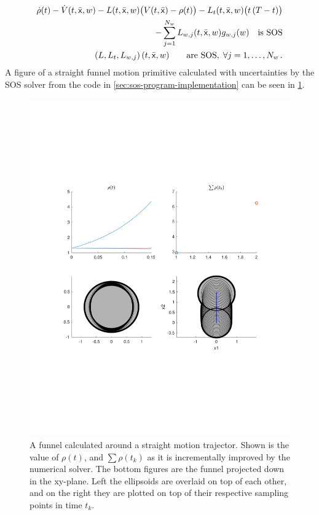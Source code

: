 \begin{align}
  \label{eq:optimizationconditionuncertain}
  \dot{\rho}(t) - \dot{V}(t,\bar{{\mathbf{\mathsf{x}}}},w) - L(t,\bar{{\mathbf{\mathsf{x}}}},w) \bigl( V(t,\bar{{\mathbf{\mathsf{x}}}}) - \rho(t) \bigr) - L_{t}(t,\bar{{\mathbf{\mathsf{x}}}},w) \bigl( t\left( T - t \right) \bigr)  & \nonumber \\
  - \sum_{j=1}^{N_{w}} L_{w,j}(t,\bar{{\mathbf{\mathsf{x}}}},w)g_{w,j}(w) \quad \text{is SOS} &  \\
  \left( L, L_t, L_{w,j} \right) (t,\bar{{\mathbf{\mathsf{x}}}},w) \qquad \text{are SOS}, \; \forall j = 1,\ldots,N_w \, . \nonumber
\end{align}
A figure of a straight funnel motion primitive calculated with uncertainties by
the \ac{SOS} solver from the code in \cref{sec:sos-program-implementation} can
be seen in \cref{fig:funnel-calculation-visuals}.

\begin{figure}
  \centering \includegraphics[scale=.5, trim={0cm 6cm 0cm
    6cm}]{figures/method/funnel-calculation-visuals}
  \caption{A funnel calculated around a straight motion trajector. Shown is the
    value of \(\rho(t)\), and \(\sum \rho(t_k)\) as it is incrementally improved
    by the numerical solver. The bottom figures are the funnel projected down in
    the xy-plane. Left the ellipsoids are overlaid on top of each other, and on
    the right they are plotted on top of their respective sampling points in
    time \(t_k\).}
  \label{fig:funnel-calculation-visuals}
\end{figure}

